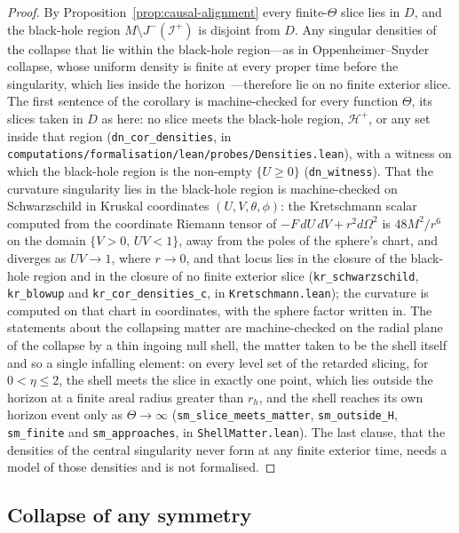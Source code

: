 \documentclass[11pt,a4paper]{article}
\theoremstyle{plain}
\theoremstyle{remark}
\begin{document}
\begin{proof}
By Proposition~\ref{prop:causal-alignment} every finite-$\Theta$ slice lies in $D$, and the black-hole region $M\setminus J^-(\mathscr{I}^+)$ is disjoint from $D$. Any singular densities of the collapse that lie within the black-hole region---as in Oppenheimer--Snyder collapse, whose uniform density is finite at every proper time before the singularity, which lies inside the horizon~\cite{Oppenheimer1939b}---therefore lie on no finite exterior slice. The first sentence of the corollary is machine-checked for every function $\Theta$, its slices taken in $D$ as here: no slice meets the black-hole region, $\mathcal{H}^+$, or any set inside that region (\texttt{dn\_cor\_densities}, in \texttt{computations/formalisation/lean/probes/Densities.lean}), with a witness on which the black-hole region is the non-empty $\{U\ge0\}$ (\texttt{dn\_witness}). That the curvature singularity lies in the black-hole region is machine-checked on Schwarzschild in Kruskal coordinates $(U,V,\theta,\phi)$: the Kretschmann scalar computed from the coordinate Riemann tensor of $-F\,dU\,dV+r^{2}d\Omega^{2}$ is $48M^{2}/r^{6}$ on the domain $\{V>0,\,UV<1\}$, away from the poles of the sphere's chart, and diverges as $UV\to1$, where $r\to0$, and that locus lies in the closure of the black-hole region and in the closure of no finite exterior slice (\texttt{kr\_schwarzschild}, \texttt{kr\_blowup} and \texttt{kr\_cor\_densities\_c}, in \texttt{Kretschmann.lean}); the curvature is computed on that chart in coordinates, with the sphere factor written in. The statements about the collapsing matter are machine-checked on the radial plane of the collapse by a thin ingoing null shell, the matter taken to be the shell itself and so a single infalling element: on every level set of the retarded slicing, for $0<\eta\le2$, the shell meets the slice in exactly one point, which lies outside the horizon at a finite areal radius greater than $r_h$, and the shell reaches its own horizon event only as $\Theta\to\infty$ (\texttt{sm\_slice\_meets\_matter}, \texttt{sm\_outside\_H}, \texttt{sm\_finite} and \texttt{sm\_approaches}, in \texttt{ShellMatter.lean}). The last clause, that the densities of the central singularity never form at any finite exterior time, needs a model of those densities and is not formalised.
\end{proof}

\subsection{Collapse of any symmetry}\label{sec:anysymmetry}
\end{document}
